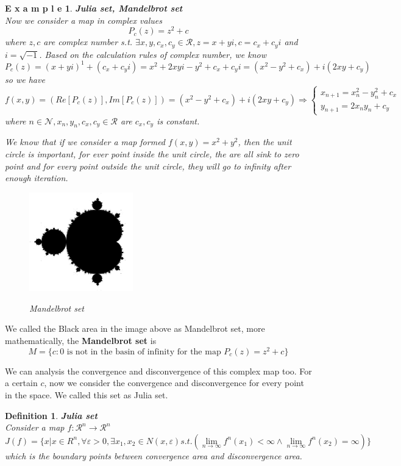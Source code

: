 \documentclass[12pt]{article}
\theoremstyle{plain}
\newtheorem{definition}{{\color{red}\textbf{Definition}}}[section]
\newtheorem{example}{\textbf{E x a m p l e}}[section]
\begin{document}
\begin{example}\textbf{Julia set, Mandelbrot set}
\\\noindent Now we consider a map in complex values
$$
P_c(z) = z^2 + c
$$
where $z, c$ are complex number s.t. $\exists x, y, c_x, c_y \in \mathcal R, z = x + yi, c = c_x + c_yi$ and $i = \sqrt{-1}$. Based on the calculation rules of complex number, we know 
$$
P_c(z) = (x+yi)^1 + (c_x + c_yi) = x^2 + 2xyi - y^2 + c_x + c_yi = (x^2 - y^2 + c_x) + i(2xy + c_y)
$$
so we have 
$$
f(x, y) = (Re[P_c(z)], Im[P_c(z)]) = (x^2 - y^2 + c_x) + i(2xy + c_y) 
\Rightarrow \left\{
\begin{array}{l}
x_{n+1} = x_n^2 - y_n^2 + c_x \\
y_{n+1} = 2x_ny_n + c_y
\end{array}\right.
$$
where $n \in \mathcal N, x_n, y_n, c_x, c_y \in \mathcal R$ are $c_x, c_y$ is constant.

We know that if we consider a map formed $f(x,y) = x^2 + y^2$, then the unit circle is important, for ever point inside the unit circle, the are all sink to zero point and for every point outside the unit circle, they will go to infinity after enough iteration. 

\begin{figure}[H]
\begin{center}
\includegraphics[width=0.4\textwidth]{figure/section4/mandelbrot.png} \\
\caption{Mandelbrot set}\label{mandelbrot-set}
\end{center}
\end{figure}
\end{example}

We called the Black area in the image above as Mandelbrot set, more mathematically, the \textbf{Mandelbrot set} is
$$
M = \{c: 0 \text{ is not in the basin of infinity for the map } P_c(z) = z^2 + c\}
$$

We can analysis the convergence and disconvergence of this complex map too. For a certain $c$, now we consider the convergence and disconvergence for every point in the space. We called this set as Julia set.
\begin{definition} \textbf{Julia set}
\\\noindent Consider a map $f: \mathcal R^n \rightarrow \mathcal R^n$
$$
J(f) = \{x | x \in R^n, \forall \varepsilon > 0, \exists x_1, x_2 \in N(x, \varepsilon) s.t. \left(\lim_{n \rightarrow \infty}f^n(x_1) < \infty \land \lim_{n \rightarrow \infty}f^n(x_2) = \infty\right)\}
$$
which is the boundary points between convergence area and disconvergence area.
\end{definition}
\end{document}
